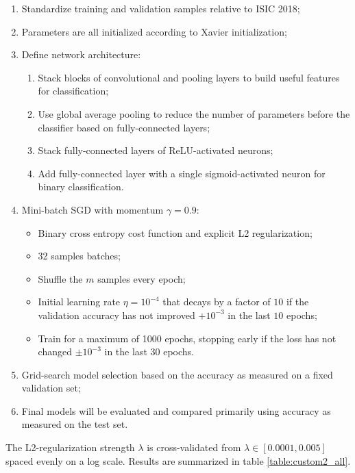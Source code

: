 \begin{enumerate}
    \item Standardize training and validation samples relative to \ac{ISIC} 2018;
    \item Parameters are all initialized according to Xavier initialization;
    \item Define network architecture:
        \begin{enumerate}
            \item Stack blocks of convolutional and pooling layers to build useful features for classification;
            \item Use global average pooling to reduce the number of parameters before the classifier based on fully-connected layers;
            \item Stack fully-connected layers of ReLU-activated neurons;
            \item Add fully-connected layer with a single sigmoid-activated neuron for binary classification.
        \end{enumerate}
    \item Mini-batch \ac{SGD} with momentum $\gamma = 0.9$:
        \begin{itemize}
            \item Binary cross entropy cost function and explicit L2 regularization;
            \item 32 samples batches;
            \item Shuffle the $m$ samples every epoch;
            \item Initial learning rate $\eta = 10^{-4}$ that decays by a factor of $10$ if the validation accuracy has not improved $+10^{-3}$ in the last $10$ epochs;
            \item Train for a maximum of 1000 epochs, stopping early if the loss has not changed $\pm 10^{-3}$ in the last $30$ epochs.
        \end{itemize}
    \item Grid-search model selection based on the accuracy as measured on a fixed validation set;
    \item Final models will be evaluated and compared primarily using accuracy as measured on the test set.
\end{enumerate}

The L2-regularization strength $\lambda$ is cross-validated from $\lambda \in [0.0001, 0.005]$ spaced evenly on a log scale. Results are summarized in table \ref{table:custom2_all}.


